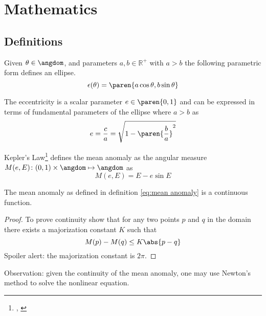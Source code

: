 % 

\section{Mathematics}
\label{sec:math}

\subsection{Definitions}
\begin{definition}
Given $\theta \in \angdom$, and parameters $a, b \in\mathbb{R}^{+}$ with $a>b$ the following parametric form defines an ellipse.
\begin{equation}
	\epsilon(\theta) = \paren{ a \cos \theta, b\sin \theta }
\label{eq:ellipse}
\end{equation}
\end{definition}
\begin{definition}
The eccentricity is a scalar parameter $e \in \paren{0,1}$ and can be expressed in terms of fundamental parameters of the ellipse where $a > b$ as
\begin{equation}
	e = \frac{c}{a} = \sqrt{1 - \paren{\frac{b}{a}}^{2}}
\label{eq:eccentricity}
\end{equation}
\end{definition}
\begin{definition}
Kepler's Law\footnote{
\cite[eq 4.5]{bate2020fundamentals}
\cite[p.159]{moulton1970introduction}
\cite[\S2.2]{vallado2022}, \cite[3-19]{kaula2013theory}} 
defines the mean anomaly as the angular measure $M(e,E)\colon(0,1)\times \angdom \mapsto \angdom $ as
\begin{equation}
	M(e,E) = E - e \sin E
\label{eq:mean anomaly}
\end{equation}
\end{definition}

\begin{theorem}
The mean anomaly as defined in definition \ref{eq:mean anomaly} is a continuous function.
\begin{proof}
To prove continuity show that for any two points $p$ and $q$ in the domain there exists a majorization constant $K$ such that
\begin{equation}
	M(p) - M(q) \le K \abs{p-q}
\label{eq:continuous}
\end{equation}
Spoiler alert: the majorization constant is $2\pi$.
\end{proof}
\end{theorem}
Observation: given the continuity of the mean anomaly, one may use Newton's method \cite[\S4.6]{gautschi2011numerical} to solve the nonlinear equation.


\endinput  %

